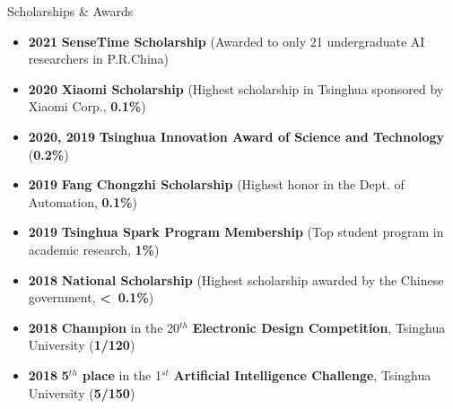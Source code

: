 \documentclass{resume} %
\begin{document}
\vspace{-0.3cm}

\begin{rSection}{Scholarships \& Awards}
\begin{itemize}
    \item \textbf{2021} \textbf{SenseTime Scholarship} (Awarded to only 21 undergraduate AI researchers in P.R.China)
    \item \textbf{2020} \textbf{Xiaomi Scholarship} (Highest scholarship in Tsinghua sponsored by Xiaomi Corp., \textbf{0.1\%})
    \item \textbf{2020, 2019} \textbf{Tsinghua Innovation Award of Science and Technology} (\textbf{0.2\%})
    \item \textbf{2019} \textbf{Fang Chongzhi Scholarship} (Highest honor in the Dept. of Automation, \textbf{0.1\%})
    \item \textbf{2019} \textbf{Tsinghua Spark Program Membership} (Top student program in academic research, \textbf{1\%})
    \item \textbf{2018} \textbf{National Scholarship} (Highest scholarship awarded by the Chinese government, \textbf{\textless~0.1\%})
    \item \textbf{2018} \textbf{Champion} in the 20$^{th}$ \textbf{Electronic Design Competition}, Tsinghua University (\textbf{1/120})%
    \item \textbf{2018} \textbf{5$^{th}$ place} in the 1$^{st}$ \textbf{Artificial Intelligence Challenge}, Tsinghua University (\textbf{5/150})%
    \newline
\end{itemize}

\end{rSection}

\vspace{-0.2cm}
\end{document}
